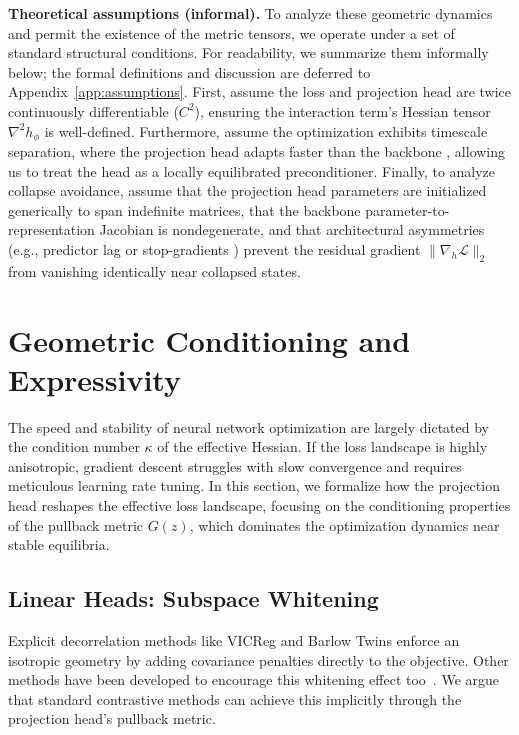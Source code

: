 \documentclass{article}
\theoremstyle{plain}
\theoremstyle{definition}
\theoremstyle{remark}
\begin{document}
\textbf{Theoretical assumptions (informal).} To analyze these geometric dynamics and permit the existence of the metric tensors, we operate under a set of standard structural conditions. For readability, we summarize them informally below; the formal definitions and discussion are deferred to Appendix~\ref{app:assumptions}. First, assume the loss and projection head are twice continuously differentiable ($C^2$), ensuring the interaction term's Hessian tensor $\nabla^2 h_\phi$ is well-defined. Furthermore, assume the optimization exhibits timescale separation, where the projection head adapts faster than the backbone \citep{raghu2020rapid, tian2021understanding}, allowing us to treat the head as a locally equilibrated preconditioner. Finally, to analyze collapse avoidance, assume that the projection head parameters are initialized generically to span indefinite matrices, that the backbone parameter-to-representation Jacobian is nondegenerate, and that architectural asymmetries (e.g., predictor lag or stop-gradients \citep{chen2021exploring}) prevent the residual gradient $\|\nabla_h \mathcal{L}\|_2$ from vanishing identically near collapsed states.

\section{Geometric Conditioning and Expressivity}
\label{sec:optimization}

The speed and stability of neural network optimization are largely dictated by the condition number $\kappa$ of the effective Hessian. If the loss landscape is highly anisotropic, gradient descent struggles with slow convergence and requires meticulous learning rate tuning. In this section, we formalize how the projection head reshapes the effective loss landscape, focusing on the conditioning properties of the pullback metric $G(z)$, which dominates the optimization dynamics near stable equilibria. 

\subsection{Linear Heads: Subspace Whitening}

Explicit decorrelation methods like VICReg and Barlow Twins enforce an isotropic geometry by adding covariance penalties directly to the objective. Other methods have been developed to encourage this whitening effect too~\citep{ermolov2021whitening}. We argue that standard contrastive methods can achieve this implicitly through the projection head's pullback metric. 
\end{document}
